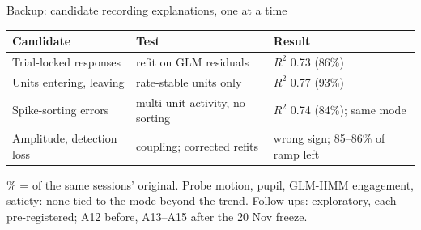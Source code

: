 \documentclass[aspectratio=169,11pt]{beamer}
\newcommand{\muted}[1]{{\color{cInk}#1}}
\newcommand{\Rsq}{$R^2$}
\begin{document}
\begin{frame}{Backup: candidate recording explanations, one at a time}
\small
\setlength{\tabcolsep}{5pt}
\begin{tabular}{@{}L{0.29\textwidth}L{0.33\textwidth}L{0.31\textwidth}@{}}
\toprule
\textbf{Candidate} & \textbf{Test} & \textbf{Result} \\
\midrule
Trial-locked responses & refit on GLM residuals & \Rsq{} 0.73 (86\%) \\
Units entering, leaving & rate-stable units only & \Rsq{} 0.77 (93\%) \\
Spike-sorting errors & multi-unit activity, no sorting & \Rsq{} 0.74 (84\%); same mode \\
Amplitude, detection loss & coupling; corrected refits & wrong sign; 85--86\% of ramp left \\
\bottomrule
\end{tabular}

\medskip
\muted{\% = of the same sessions' original. Probe motion, pupil, GLM-HMM engagement, satiety: none tied to the mode
beyond the trend. Follow-ups: exploratory, each pre-registered; A12 before, A13--A15 after the 20 Nov freeze.}
\end{frame}
\end{document}
